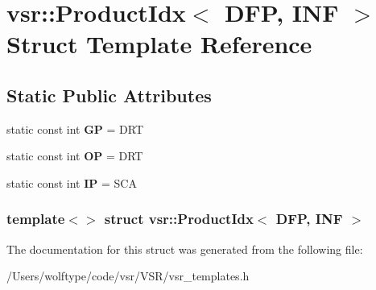 \hypertarget{structvsr_1_1_product_idx_3_01_d_f_p_00_01_i_n_f_01_4}{\section{vsr\-:\-:Product\-Idx$<$ D\-F\-P, I\-N\-F $>$ Struct Template Reference}
\label{structvsr_1_1_product_idx_3_01_d_f_p_00_01_i_n_f_01_4}
}
\subsection*{Static Public Attributes}
\begin{DoxyCompactItemize}
\item 
\hypertarget{structvsr_1_1_product_idx_3_01_d_f_p_00_01_i_n_f_01_4_a5593935755818277bce20c168c2c6548}{static const int {\bfseries G\-P} = D\-R\-T}\label{structvsr_1_1_product_idx_3_01_d_f_p_00_01_i_n_f_01_4_a5593935755818277bce20c168c2c6548}

\item 
\hypertarget{structvsr_1_1_product_idx_3_01_d_f_p_00_01_i_n_f_01_4_ac0b09672203eac9a2dcce87668201808}{static const int {\bfseries O\-P} = D\-R\-T}\label{structvsr_1_1_product_idx_3_01_d_f_p_00_01_i_n_f_01_4_ac0b09672203eac9a2dcce87668201808}

\item 
\hypertarget{structvsr_1_1_product_idx_3_01_d_f_p_00_01_i_n_f_01_4_a5e8bd1d5b7b4e1d62cb76ac369f75eb6}{static const int {\bfseries I\-P} = S\-C\-A}\label{structvsr_1_1_product_idx_3_01_d_f_p_00_01_i_n_f_01_4_a5e8bd1d5b7b4e1d62cb76ac369f75eb6}

\end{DoxyCompactItemize}
\subsubsection*{template$<$$>$ struct vsr\-::\-Product\-Idx$<$ D\-F\-P, I\-N\-F $>$}



The documentation for this struct was generated from the following file\-:\begin{DoxyCompactItemize}
\item 
/\-Users/wolftype/code/vsr/\-V\-S\-R/vsr\-\_\-templates.\-h\end{DoxyCompactItemize}
